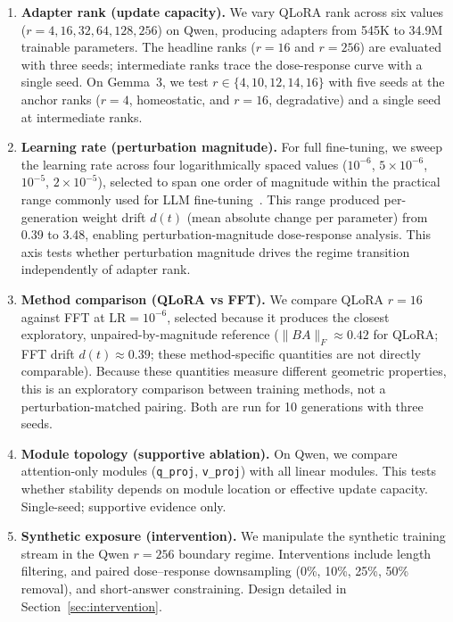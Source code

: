 \documentclass[a4paper,fleqn]{cas-dc}
\newif\ifshowchanges
\newcommand{\rev}[1]{\ifshowchanges{\color{blue}#1}\else{#1}\fi}
\begin{document}
\begin{enumerate}
\item \textbf{Adapter rank (update capacity).} We vary QLoRA rank across six
values ($r=4,16,32,64,128,256$) on Qwen, producing adapters from 545K to 34.9M
trainable parameters. The headline ranks ($r=16$ and $r=256$) are evaluated with
three seeds; intermediate ranks trace the dose-response curve with a single
seed. On Gemma~3, we test $r \in \{4,10,12,14,16\}$ with five seeds at the
anchor ranks ($r=4$, homeostatic, and $r=16$, degradative) and a single seed at intermediate ranks.

\item \textbf{Learning rate (perturbation magnitude).} For full fine-tuning, we
sweep the learning rate across four logarithmically spaced values ($10^{-6}$,
$5{\times}10^{-6}$, $10^{-5}$, $2{\times}10^{-5}$), selected to span one
order of magnitude within the practical range commonly used for LLM
fine-tuning~\citep{hu2022,dettmers2023}. This range produced per-generation
\rev{weight drift $d(t)$ (mean absolute change per parameter)} from 0.39 to 3.48, enabling perturbation-magnitude
dose-response analysis. This axis tests whether
perturbation magnitude drives the regime transition independently of adapter
rank.

\item \textbf{Method comparison (QLoRA vs FFT).} We compare QLoRA $r=16$
against FFT at $\mathrm{LR}=10^{-6}$, selected because it produces the closest
exploratory, unpaired-by-magnitude reference ($\|BA\|_F \approx 0.42$ for QLoRA; FFT drift $d(t) \approx 0.39$; these method-specific quantities are not directly comparable). \rev{Because these quantities measure different geometric properties, this is an exploratory comparison between training methods, not a perturbation-matched pairing.} Both
are run for 10 generations with three seeds.

\item \textbf{Module topology (supportive ablation).} On Qwen, we compare
attention-only modules (\texttt{q\_proj}, \texttt{v\_proj}) with all linear
modules. This tests whether stability depends on module location or effective
update capacity. Single-seed; supportive evidence only.

\item \textbf{Synthetic exposure (intervention).} We manipulate the synthetic
training stream in the Qwen $r=256$ boundary regime. Interventions include
length filtering, and paired dose--response downsampling (0\%, 10\%, 25\%, 50\%
removal), and short-answer constraining. Design detailed in
Section~\ref{sec:intervention}.
\end{enumerate}
\end{document}
